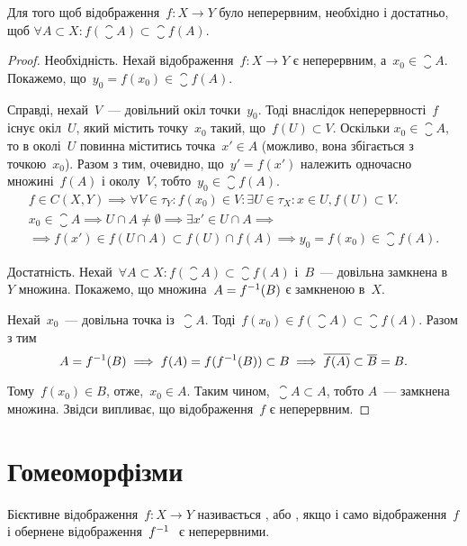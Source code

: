 \begin{theorem}
Для того щоб відображення~$f: X \to Y$
було неперервним, необхідно і достатньо, щоб
$\forall A \subset X: f(\closure{A}) \subset \closure{f(A)}$.
\end{theorem}

\begin{proof}
Необхідність. Нехай відображення~$f: X \to Y$ є неперервним, а~$x_0 \in \closure{A}$.
Покажемо, що~$y_0 = f(x_0) \in \closure{f(A)}$.

Справді, нехай~$V$~--- довільний окіл точки~$y_0$. Тоді внаслідок неперервності~$f$
існує окіл~$U$, який містить точку~$x_0$ такий, що~$f(U) \subset V$. Оскільки
$x_0 \in \closure{A}$, то в околі~$U$ повинна міститись точка~$x' \in A$
(можливо, вона збігається з точкою~$x_0$). Разом з тим, очевидно, що~$y' = f(x')$
належить одночасно множині~$f(A)$ і околу~$V$, тобто~$y_0 \in \closure{f(A)}$.
\begin{multline*}
f \in C(X, Y) \implies \forall V \in \tau_Y: f(x_0) \in V: \exists U \in \tau_X: x \in U, f(U) \subset V. \\
x_0 \in \closure{A} \implies U \cap A \ne \emptyset \implies \exists x' \in U \cap A \implies \\
\implies f(x') \in f(U \cap A) \subset f(U) \cap f(A) \implies y_0 = f(x_0) \in \closure{f(A)}.
\end{multline*}

Достатність. Нехай~$\forall A \subset X: f(\closure{A}) \subset \closure{f(A)}$
і~$B$~--- довільна замкнена в~$Y$ множина. Покажемо, що множина~$A = f^{-1}(B)$
є замкненою в~$X$.

Нехай~$x_0$~--- довільна точка із~$\closure{A}$.
Тоді~$f(x_0) \in f(\closure{A}) \subset \closure{f(A)}$. Разом з тим
\[ A = f^{-1}(B) \implies f(A) = f(f^{-1}(B)) \subset B \implies \overline{f(A)} \subset \overline{B} = B. \]

Тому~$f(x_0) \in B$, отже,~$x_0 \in A$. Таким чином,~$\closure{A} \subset A$, тобто
$A$~--- замкнена множина. Звідси випливає, що відображення~$f$ є неперервним.
\end{proof}

\section{Гомеоморфізми}

\begin{definition}
Бієктивне відображення~$f: X \to Y$
називається , або , якщо і
само відображення~$f$ і обернене відображення~$f^{-1}~$ є неперервними.
\end{definition}

